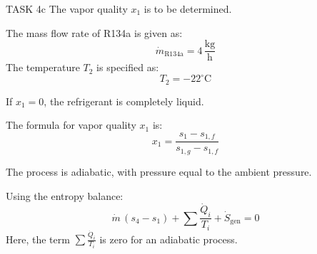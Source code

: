 TASK 4c  
The vapor quality \( x_1 \) is to be determined.  

The mass flow rate of R134a is given as:  
\[
\dot{m}_{\text{R134a}} = 4 \, \frac{\text{kg}}{\text{h}}
\]  
The temperature \( T_2 \) is specified as:  
\[
T_2 = -22^\circ\text{C}
\]  

If \( x_1 = 0 \), the refrigerant is completely liquid.  

The formula for vapor quality \( x_1 \) is:  
\[
x_1 = \frac{s_1 - s_{1,f}}{s_{1,g} - s_{1,f}}
\]  

The process is adiabatic, with pressure equal to the ambient pressure.  

Using the entropy balance:  
\[
\dot{m} \, (s_4 - s_1) + \sum \frac{\dot{Q}_i}{T_i} + \dot{S}_{\text{gen}} = 0
\]  
Here, the term \(\sum \frac{\dot{Q}_i}{T_i}\) is zero for an adiabatic process.